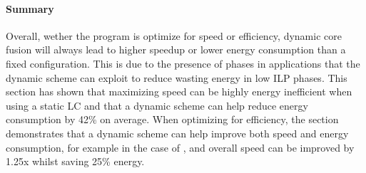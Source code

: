 \paragraph{Summary}

Overall, wether the program is optimize for speed or efficiency, dynamic core fusion will always lead to higher speedup or lower energy consumption than a fixed configuration.
This is due to the presence of phases in applications that the dynamic scheme can exploit to reduce wasting energy in low ILP phases.
This section has shown that maximizing speed can be highly energy inefficient when using a static LC and that a dynamic scheme can help reduce energy consumption by 42\% on average.
When optimizing for efficiency, the section demonstrates that a dynamic scheme can help improve both speed and energy consumption, for example in the case of , and overall speed can be improved by 1.25x whilst saving 25\% energy.

